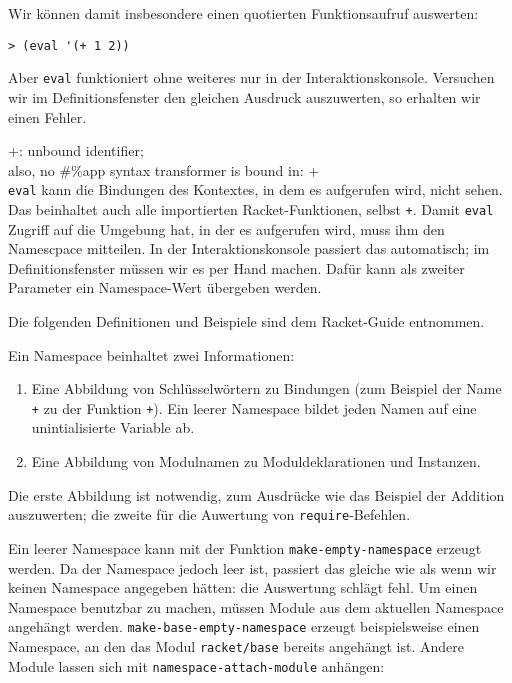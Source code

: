 Wir können damit insbesondere einen quotierten Funktionsaufruf auswerten:

\begin{lstlisting}
> (eval '(+ 1 2))
\end{lstlisting}
{}

Aber \texttt{eval} funktioniert ohne weiteres nur in der Interaktionskonsole. Versuchen wir im Definitionsfenster den gleichen Ausdruck auszuwerten, so erhalten wir einen Fehler.

{\color{red}\ttfamily\small\hspace{5pt} +: unbound identifier;}\\
{\color{red}\ttfamily\small\hspace{5pt} also, no \#\%app syntax transformer is bound in: +}\\

\texttt{eval} kann die Bindungen des Kontextes, in dem es aufgerufen wird, nicht sehen. Das beinhaltet auch alle importierten Racket-Funktionen, selbst \texttt{+}. Damit \texttt{eval} Zugriff auf die Umgebung hat, in der es aufgerufen wird, muss ihm den Namescpace mitteilen. In der Interaktionskonsole passiert das automatisch; im Definitionsfenster müssen wir es per Hand machen. Dafür kann als zweiter Parameter ein Namespace-Wert übergeben werden. 

Die folgenden Definitionen und Beispiele sind dem Racket-Guide \cite{racketguide-namespace} entnommen.

Ein Namespace beinhaltet zwei Informationen:
\begin{enumerate}
 \item Eine Abbildung von Schlüsselwörtern zu Bindungen (zum Beispiel der Name \texttt{+} zu der Funktion \texttt{+}). Ein leerer Namespace bildet jeden Namen auf eine unintialisierte Variable ab.
 \item Eine Abbildung von Modulnamen zu Moduldeklarationen und Instanzen.
\end{enumerate}

Die erste Abbildung ist notwendig, zum Ausdrücke wie das Beispiel der Addition auszuwerten; die zweite für die Auwertung von \texttt{require}-Befehlen.

Ein leerer Namespace kann mit der Funktion \texttt{make-empty-namespace} erzeugt werden. Da der Namespace jedoch leer ist, passiert das gleiche wie als wenn wir keinen Namespace angegeben hätten: die Auswertung schlägt fehl. Um einen Namespace benutzbar zu machen, müssen Module aus dem aktuellen Namespace angehängt werden. \texttt{make-base-empty-namespace} erzeugt beispielsweise einen Namespace, an den das Modul \texttt{racket/base} bereits angehängt ist. Andere Module lassen sich mit \texttt{namespace-attach-module} anhängen:

